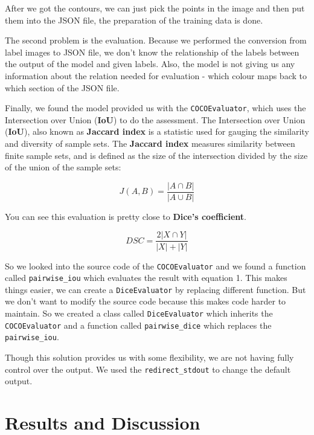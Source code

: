 \documentclass[conference]{IEEEtran}
\begin{document}
After we got the contours, we can just pick the points in the image and then put them into the JSON file, the preparation of the training data is done.

The second problem is the evaluation. Because we performed the conversion from label images to JSON file, we don't know the relationship of the labels between the output of the model and given labels. Also, the model is not giving us any information about the relation needed for evaluation - which colour maps back to which section of the JSON file. 

Finally, we found the model provided us with the \verb|COCOEvaluator|, which uses the Intersection over Union (\textbf{IoU}) to do the assessment. The Intersection over Union (\textbf{IoU}), also known as \textbf{Jaccard index} is a statistic used for gauging the similarity and diversity of sample sets. The \textbf{Jaccard index} measures similarity between finite sample sets, and is defined as the size of the intersection divided by the size of the union of the sample sets:

\begin{equation}
    J(A,B)=\frac{|A\cap B|}{|A\cup B|}
    \label{eq:IoU}
\end{equation}

You can see this evaluation is pretty close to \textbf{Dice's coefficient}. 

\begin{equation}
	DSC = \frac{2|X \cap Y|}{|X| + |Y|}
	\label{eq:Dice}
\end{equation}

So we looked into the source code of the \verb|COCOEvaluator| and we found a function called \verb|pairwise_iou| which evaluates the result with equation 1. This makes things easier, we can create a \verb|DiceEvaluator| by replacing different function. But we don't want to modify the source code because this makes code harder to maintain. So we created a class called \verb|DiceEvaluator| which inherits the \verb|COCOEvaluator| and a function called \verb|pairwise_dice| which replaces the \verb|pairwise_iou|. 

Though this solution provides us with some flexibility, we are not having fully control over the output. We used the \verb|redirect_stdout| to change the default output. 


\section{Results and Discussion}
\end{document}
